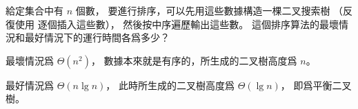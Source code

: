 \startEXERCISE
給定集合中有 $n$ 個數，
要進行排序，可以先用這些數據構造一棵二叉搜索樹
（反復使用  逐個插入這些數），
然後按中序遍歷輸出這些數。
這個排序算法的最壞情況和最好情況下的運行時間各爲多少？
\stopEXERCISE

\startANSWER
最壞情況爲 $\Theta(n^2)$，
數據本來就是有序的，所生成的二叉樹高度爲 $n$。

最好情況爲 $\Theta(n\lg{n})$，
此時所生成的二叉樹高度爲 $\Theta(\lg{n})$，
即爲平衡二叉樹。
\stopANSWER
